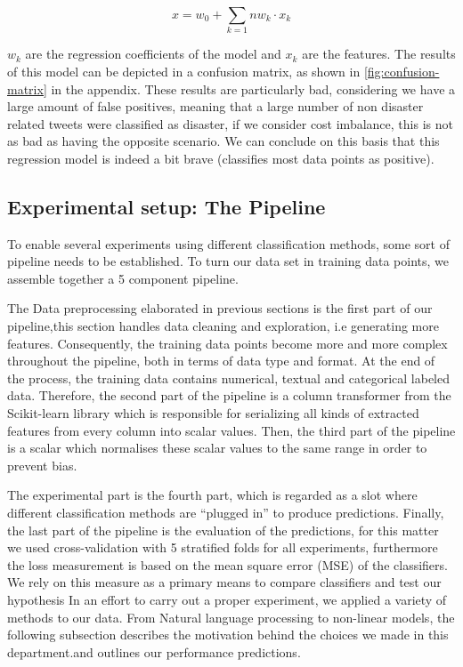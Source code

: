 $$x = w_0 + \sum_{k=1}{n} w_k \cdot x_{k}$$

$w_k$ are the regression coefficients of the model and $x_k$ are the features.
The results of this model can be depicted in a confusion matrix, as shown in \autoref{fig:confusion-matrix} in the appendix.
These results are particularly bad, considering we have a large amount of false positives, meaning that a large number of non disaster related tweets were classified as disaster, if we consider cost imbalance, this is not as bad as having the opposite scenario.
We can conclude on this basis that this regression model is indeed a bit brave (classifies most data points as positive).

\subsection{Experimental setup: The Pipeline}

To enable several experiments using different classification methods, some sort of pipeline needs to be established.
To turn our data set in training data points, we assemble together a 5 component pipeline.

The Data preprocessing elaborated in previous sections is the first part of our pipeline,this section handles data cleaning and exploration, i.e generating more features.
Consequently, the training data points become more and more complex throughout the pipeline, both in terms of data type and format.
At the end of the process, the training data contains numerical, textual and categorical labeled data.
Therefore, the second part of the pipeline is a column transformer from the Scikit-learn library which is responsible for serializing all kinds of extracted features from every column into scalar values.
Then, the third part of the pipeline is a scalar which normalises these scalar values to the same range in order to prevent bias.

The experimental part is the fourth part, which is regarded as a slot where different classification methods are “plugged in” to produce predictions.
Finally, the last part of the pipeline is the evaluation of the predictions, for this matter we used cross-validation with 5 stratified folds for all experiments, furthermore the loss measurement is based on the mean square error (MSE) of the classifiers.
We rely on this measure as a primary means to compare classifiers and test our hypothesis
In an effort to carry out a proper experiment, we applied a variety of methods to our data.
From Natural language processing to non-linear models, the following subsection describes the motivation behind the choices we made in this department.and outlines our performance predictions.

